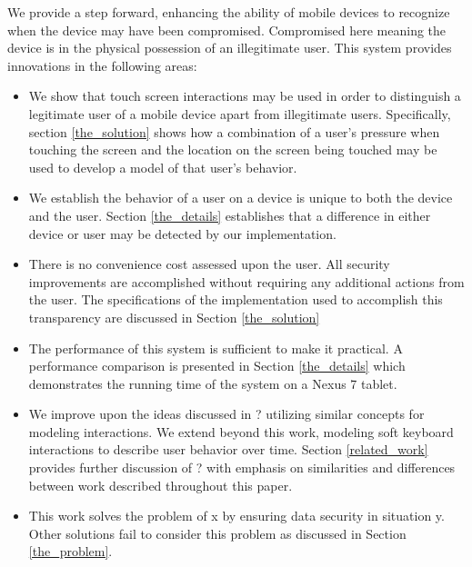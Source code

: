 We provide a step forward, 
enhancing the ability of mobile devices to
recognize when the device may have been compromised.
Compromised here meaning the device is in
the physical possession of an illegitimate user.
This system provides innovations in the following areas:
\begin{itemize}
\item We show that touch screen interactions may be used in order to
  distinguish a legitimate user of a mobile device apart from
  illegitimate users.
  Specifically, section
  \ref{the_solution} %
  shows how a combination of 
  a user's pressure when touching the screen and 
  the location on the screen being touched
  may be used to develop a model of that user's behavior.
\item We establish the behavior of a user on a device
  is unique to both the device and the user.
  Section 
  \ref{the_details} %
  establishes that a difference in either device or user
  may be detected by our implementation.
\item There is no convenience cost assessed upon the user.
  All security improvements are accomplished without requiring any additional
  actions from the user.
  The specifications of the implementation used to accomplish 
  this transparency are discussed in Section
  \ref{the_solution} %
\item The performance of this system is sufficient to make it practical.
  A performance comparison is presented in Section
  \ref{the_details} %
  which demonstrates the running time of the system on 
  a Nexus 7 tablet.
\item We improve upon the ideas discussed in ? %
  utilizing similar concepts for modeling interactions. 
  We extend beyond this work,
  modeling soft keyboard interactions
  to describe user behavior over time.
  Section
  \ref{related_work} %
  provides further discussion of ?%
  with emphasis on similarities and differences
  between work described throughout this paper.
\item This work solves the problem of x %
  by ensuring data security in situation y. %
  Other solutions fail to consider this problem
  as discussed in Section
  \ref{the_problem}.
\end{itemize}

